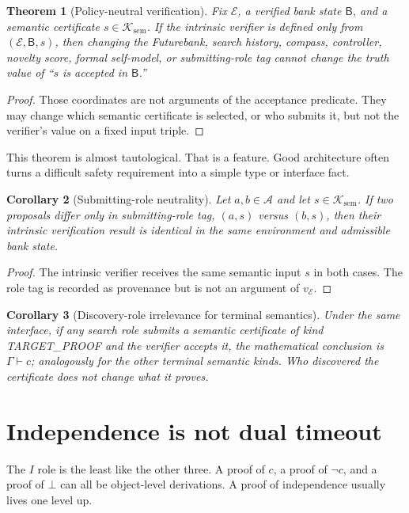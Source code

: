 \documentclass[11pt,openany]{book}
\newtheorem{theorem}{Theorem}[chapter]
\newtheorem{corollary}[theorem]{Corollary}
\theoremstyle{definition}
\theoremstyle{remark}
\newcommand{\Bank}{\mathsf{B}}
\newcommand{\Cert}{\mathcal{K}}
\newcommand{\Env}{\mathcal{E}}
\newcommand{\Agents}{\mathcal{A}}
\newcommand{\botc}{\bot}
\begin{document}
\begin{theorem}[Policy-neutral verification]\label{thm:neutral}
Fix $\Env$, a verified bank state $\Bank$, and a semantic certificate $s\in\Cert_{\mathrm{sem}}$. If the intrinsic verifier is defined only from $(\Env,\Bank,s)$, then changing the Futurebank, search history, compass, controller, novelty score, formal self-model, or submitting-role tag cannot change the truth value of ``$s$ is accepted in $\Bank$.''
\end{theorem}
\begin{proof}
Those coordinates are not arguments of the acceptance predicate. They may change which semantic certificate is selected, or who submits it, but not the verifier's value on a fixed input triple.
\end{proof}

This theorem is almost tautological. That is a feature. Good architecture often turns a difficult safety requirement into a simple type or interface fact.

\begin{corollary}[Submitting-role neutrality]\label{cor:roleneutral}
Let $a,b\in\Agents$ and let $s\in\Cert_{\mathrm{sem}}$. If two proposals differ only in submitting-role tag, $(a,s)$ versus $(b,s)$, then their intrinsic verification result is identical in the same environment and admissible bank state.
\end{corollary}
\begin{proof}
The intrinsic verifier receives the same semantic input $s$ in both cases. The role tag is recorded as provenance but is not an argument of $v_{\Env}$.
\end{proof}

\begin{corollary}[Discovery-role irrelevance for terminal semantics]\label{cor:discoveryirrelevance}
Under the same interface, if any search role submits a semantic certificate of kind \textsf{TARGET\_PROOF} and the verifier accepts it, the mathematical conclusion is $\Gamma\vdash c$; analogously for the other terminal semantic kinds. Who discovered the certificate does not change what it proves.
\end{corollary}


\section{Independence is not dual timeout}
The $I$ role is the least like the other three. A proof of $c$, a proof of $\neg c$, and a proof of $\botc$ can all be object-level derivations. A proof of independence usually lives one level up.
\end{document}

